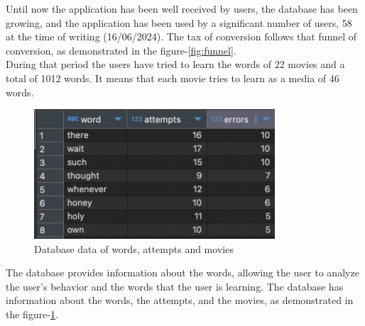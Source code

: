 \documentclass[12pt]{article}
\begin{document}
Until now the application has been well received by users, the database has been growing, and the application has been used by a significant number of users, 58 at the time of writing (16/06/2024). The tax of conversion follows that funnel of conversion, as demonstrated in the figure-\ref{fig:funnel}. \\ 
During that period the users have tried to learn the words of 22 movies and a total of 1012 words. It means that each movie tries to learn as a media of 46 words.\\
\begin{figure}[!h]
  \centering
  \caption{
  Database data of words, attempts and movies
  }
  \label{fig:database_data}
  \includegraphics[width=0.80\textwidth]{assets/32.png}
\end{figure}
The database provides information about the words, allowing the user to analyze the user's behavior and the words that the user is learning. The database has information about the words, the attempts, and the movies, as demonstrated in the figure-\ref{fig:database_data}. \\
\end{document}

